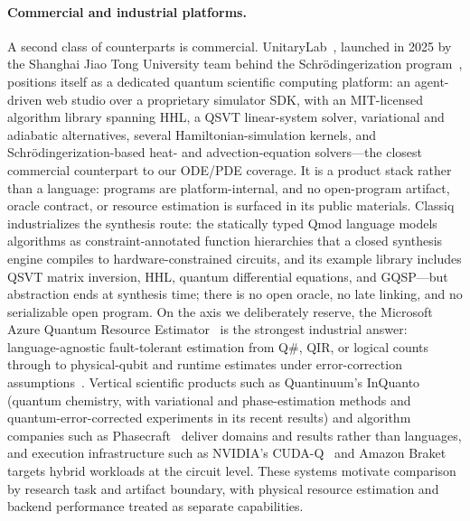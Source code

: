 \paragraph{Commercial and industrial platforms.}
A second class of counterparts is commercial.
UnitaryLab~\cite{unitarylab2025platform}, launched in 2025 by the
Shanghai Jiao Tong University team behind the Schr\"odingerization
program~\cite{jin2024schrodingerization,hu2024schrocircuits}, positions
itself as a dedicated quantum scientific computing platform: an
agent-driven web studio over a proprietary simulator SDK, with an
MIT-licensed algorithm library spanning HHL, a QSVT linear-system solver,
variational and adiabatic alternatives, several Hamiltonian-simulation
kernels, and Schr\"odingerization-based heat- and advection-equation
solvers---the closest commercial counterpart to our ODE/PDE coverage.  It
is a product stack rather than a language: programs are
platform-internal, and no open-program artifact, oracle contract, or
resource estimation is surfaced in its public materials.
Classiq~\cite{classiq2026platform} industrializes the synthesis route: the
statically typed Qmod language models algorithms as constraint-annotated
function hierarchies that a closed synthesis engine compiles to
hardware-constrained circuits, and its example library includes QSVT
matrix inversion, HHL, quantum differential equations, and GQSP---but
abstraction ends at synthesis time; there is no open oracle, no late
linking, and no serializable open program.  On the axis we deliberately
reserve, the Microsoft Azure Quantum Resource
Estimator~\cite{microsoft2026azureqe} is the strongest industrial answer:
language-agnostic fault-tolerant estimation from Q\#, QIR, or logical
counts through to physical-qubit and runtime estimates under
error-correction
assumptions~\cite{beverland2022assessing}.  Vertical scientific products
such as Quantinuum's InQuanto~\cite{quantinuum2026inquanto} (quantum
chemistry, with variational and phase-estimation methods and
quantum-error-corrected experiments in its recent results) and algorithm
companies such as
Phasecraft~\cite{phasecraft2026} deliver domains and results rather than
languages, and execution infrastructure such as NVIDIA's
CUDA-Q~\cite{nvidia2026cudaq} and Amazon
Braket~\cite{amazonbraket2026sdk} targets hybrid workloads at the circuit
level. These systems motivate comparison by research task and artifact
boundary, with physical resource estimation and backend performance
treated as separate capabilities.

